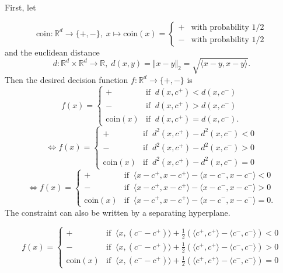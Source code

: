 First, let

\[
\mathrm{coin}:\mathbb{R}^{d}\rightarrow\{+,-\},\; x\mapsto\mathrm{coin}(x)=\begin{cases}
+ & \text{with probability }1/2\\
- & \text{with probability }1/2
\end{cases}
\]
and the euclidean distance
\[
d:\mathbb{R}^{d}\times\mathbb{R}^{d}\rightarrow\mathbb{R},\; d(x,y)=\Vert x-y\Vert_{2}=\sqrt{\langle x-y,x-y\rangle}.
\]
Then the desired decision function $f:\mathbb{R}^{d}\rightarrow\{+,-\}$
is 
\[
f(x)=\begin{cases}
+ & \text{if }\: d(x,c^{+})<d(x,c^{-})\\
- & \text{if }\: d(x,c^{+})>d(x,c^{-})\\
\mathrm{coin}(x) & \text{if }\: d(x,c^{+})=d(x,c^{-}).
\end{cases}
\]
\[
\Leftrightarrow f(x)=\begin{cases}
+ & \text{if }\: d^{2}(x,c^{+})-d^{2}(x,c^{-})<0\\
- & \text{if }\: d^{2}(x,c^{+})-d^{2}(x,c^{-})>0\\
\mathrm{coin}(x) & \text{if }\: d^{2}(x,c^{+})-d^{2}(x,c^{-})=0
\end{cases}
\]
\[
\Leftrightarrow f(x)=\begin{cases}
+ & \text{if }\:\langle x-c^{+},x-c^{+}\rangle-\langle x-c^{-},x-c^{-}\rangle<0\\
- & \text{if }\:\langle x-c^{+},x-c^{+}\rangle-\langle x-c^{-},x-c^{-}\rangle>0\\
\mathrm{coin}(x) & \text{if }\:\langle x-c^{+},x-c^{+}\rangle-\langle x-c^{-},x-c^{-}\rangle=0.
\end{cases}
\]
The constraint can also be written by a separating hyperplane.

\[
f(x)=\begin{cases}
+ & \text{if }\:\langle x,\left(c^{-}-c^{+}\right)\rangle+\frac{1}{2}\left(\langle c^{+},c^{+}\rangle-\langle c^{-},c^{-}\rangle\right)<0\\
- & \text{if }\:\langle x,\left(c^{-}-c^{+}\right)\rangle+\frac{1}{2}\left(\langle c^{+},c^{+}\rangle-\langle c^{-},c^{-}\rangle\right)>0\\
\mathrm{coin}(x) & \text{if }\:\langle x,\left(c^{-}-c^{+}\right)\rangle+\frac{1}{2}\left(\langle c^{+},c^{+}\rangle-\langle c^{-},c^{-}\rangle\right)=0
\end{cases}
\]